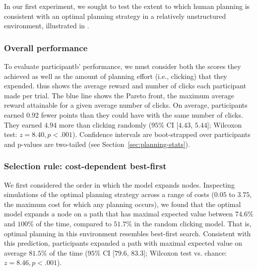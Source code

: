 In our first experiment, we sought to test the extent to which human planning is consistent with an optimal planning strategy in a relatively unstructured environment, illustrated in .

\subsubsection{Overall performance}\label{sec:planning-overall}

To evaluate participantb' performance, we must consider both the scores they achieved as well as the amount of planning effort (i.e., clicking) that they expended.  thus shows the average reward and number of clicks each participant made per trial. The blue line shows the Pareto front, the maximum average reward attainable for a given average number of clicks. On average, participants earned $0.92$ fewer points than they could have with the same number of clicks. They earned $4.94$ more than clicking randomly ($95\%$ CI [$4.43$, $5.44$]; Wilcoxon test: $z = 8.40, p < .001$). Confidence intervals are boot-strapped over participants and p-values are two-tailed (see Section~\ref{sec:planning-stats}).

\subsubsection{Selection rule: cost-dependent best-first}\label{sec:planning-selection}
We first considered the order in which the model expands nodes. Inspecting simulations of the optimal planning strategy across a range of costs ($0.05$ to $3.75$, the maximum cost for which any planning occurs), we found that the optimal model expands a node on a path that has maximal expected value between $74.6\%$ and $100\%$ of the time, compared to $51.7\%$ in the random clicking model.
That is, optimal planning in this environment resembles best-first search. Consistent with this prediction, participants expanded a path with maximal expected value on average $81.5\%$ of the time ($95\%$ CI [$79.6$, $83.3$]; Wilcoxon test vs. chance: $z = 8.46, p < .001$).

